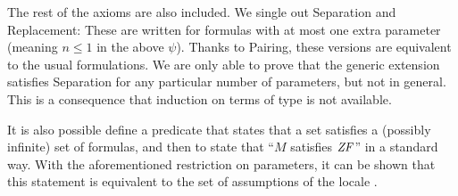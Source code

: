 The rest of the axioms are also
included. We single out Separation and Replacement: These are written
for formulas with at most one extra parameter (meaning $n\leq 1$ in the
above $\psi$). Thanks to Pairing, these 
versions are equivalent to the usual formulations. We are only able to
prove that the generic extension satisfies Separation for any particular
number of parameters, but not in general. This is a consequence that
induction on terms of type \tyo{} is not available.

It is also possible define a predicate that states that a set
satisfies a (possibly infinite) set of formulas, and then to state
that ``$M$ satisfies $\mathit{ZF}$'' in a standard way. With the
aforementioned restriction on parameters, it can be shown that this
statement is equivalent to the set of assumptions of the locale
.
%
